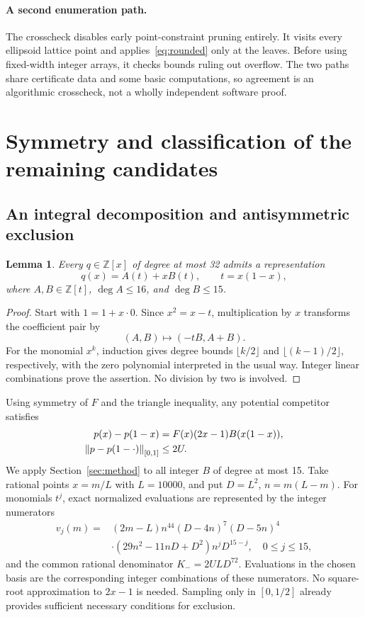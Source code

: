 \documentclass[11pt,a4paper]{article}
\newtheorem{lemma}[theorem]{Lemma}
\newcommand{\Z}{\mathbb Z}
\newcommand{\norm}[1]{\left\lVert#1\right\rVert}
\begin{document}
\paragraph{A second enumeration path.}
The crosscheck disables early point-constraint pruning entirely. It visits every ellipsoid lattice point and applies~\eqref{eq:rounded} only at the leaves. Before using fixed-width integer arrays, it checks bounds ruling out overflow. The two paths share certificate data and some basic computations, so agreement is an algorithmic crosscheck, not a wholly independent software proof.

\section{Symmetry and classification of the remaining candidates}
\subsection{An integral decomposition and antisymmetric exclusion}
\begin{lemma}\label{lem:decomposition}
Every $q\in\Z[x]$ of degree at most 32 admits a representation
\[
q(x)=A(t)+xB(t),\qquad t=x(1-x),
\]
where $A,B\in\Z[t]$, $\deg A\le16$, and $\deg B\le15$.
\end{lemma}
\begin{proof}
Start with $1=1+x\cdot0$. Since $x^2=x-t$, multiplication by $x$ transforms the coefficient pair by
\[
(A,B)\longmapsto(-tB,A+B).
\]
For the monomial $x^k$, induction gives degree bounds $\lfloor k/2\rfloor$ and $\lfloor(k-1)/2\rfloor$, respectively, with the zero polynomial interpreted in the usual way. Integer linear combinations prove the assertion. No division by two is involved.
\end{proof}

Using symmetry of $F$ and the triangle inequality, any potential competitor satisfies
\begin{align}
p(x)-p(1-x)&=F(x)(2x-1)B(x(1-x)),\notag\\
\norm{p-p(1-\cdot)}_{[0,1]}&\le2U.\label{eq:anti}
\end{align}
We apply Section~\ref{sec:method} to all integer $B$ of degree at most 15. Take rational points $x=m/L$ with $L=10000$, and put $D=L^2$, $n=m(L-m)$. For monomials $t^j$, exact normalized evaluations are represented by the integer numerators
\begin{align*}
v_j(m)={}&(2m-L)n^{44}(D-4n)^7(D-5n)^4\\
&\cdot(29n^2-11nD+D^2)n^jD^{15-j},\quad 0\le j\le15,
\end{align*}
and the common rational denominator $K_-=2ULD^{72}$. Evaluations in the chosen basis are the corresponding integer combinations of these numerators. No square-root approximation to $2x-1$ is needed. Sampling only in $[0,1/2]$ already provides sufficient necessary conditions for exclusion.
\end{document}
